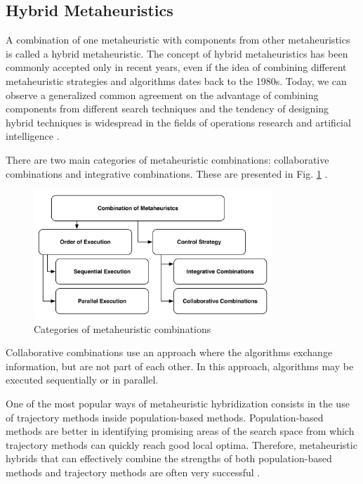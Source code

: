 \documentclass[espaco=umemeio,chapter=TITLE,twoside,openright]{abnt}
\begin{document}
\subsection{Hybrid  Metaheuristics}

A combination of one metaheuristic with components from other metaheuristics is called a hybrid metaheuristic. The concept of hybrid metaheuristics has been commonly accepted only in recent years, even if the idea of combining different metaheuristic strategies and algorithms dates back to the 1980s. Today, we can observe a generalized common agreement on the advantage of combining components from different search techniques and the tendency of designing hybrid techniques is widespread in the fields of operations research and artificial intelligence \cite{raidl2010metaheuristic}.


There are two main categories of metaheuristic combinations: collaborative combinations and integrative combinations. These are presented in Fig. \ref{fig:metaheuristc} \cite{Raidl2006}.

\begin{figure}[h]
\centering
\includegraphics[width=0.8\textwidth]{./images/metaheuristc2.png}
\caption{Categories of metaheuristic combinations \cite{Puchinger2005} }
\label{fig:metaheuristc}
\end{figure}

Collaborative combinations use an approach where the algorithms exchange information, but are not part of each other. In this approach, algorithms may be executed sequentially or in parallel.

One of the most popular ways of metaheuristic hybridization consists in the use of trajectory methods inside population-based methods. Population-based methods are better in identifying promising areas of the search space from which trajectory methods can quickly reach good local optima. Therefore, metaheuristic hybrids that can effectively combine the strengths of both population-based methods and trajectory methods are often very successful \cite{raidl2010metaheuristic}.
\end{document}
